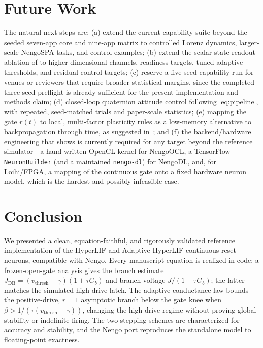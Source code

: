 \documentclass[11pt]{article}
\newcommand{\vth}{v_{\mathrm{thresh}}}
\newcommand{\Gb}{G_{b}}
\newcommand{\Jdb}{J_{\mathrm{DB}}}
\newcommand{\code}[1]{\texttt{#1}}
\begin{document}
\section{Future Work}\label{sec:future}
The natural next steps are: (a) extend the current capability suite beyond the
seeded seven-app core and nine-app matrix to controlled Lorenz dynamics,
larger-scale NengoSPA tasks, and control examples; (b) extend the scalar
state-readout ablation of  to higher-dimensional
channels, readiness targets, tuned adaptive thresholds, and residual-control
targets; (c) reserve a five-seed capability run for venues or reviewers that
require broader statistical margins, since the completed three-seed preflight is
already sufficient for the present implementation-and-methods claim; (d)
closed-loop quaternion attitude control following
\cref{eq:pipeline}, with repeated, seed-matched trials and paper-scale
statistics; (e) mapping the gate $r(t)$ to local, multi-factor plasticity rules
as a low-memory alternative to backpropagation through time, as suggested
in~\cite{hyperlif_theory}; and (f) the backend/hardware engineering that
 shows is currently required for any target beyond
the reference simulator---a hand-written OpenCL kernel for NengoOCL, a
TensorFlow \code{NeuronBuilder} (and a maintained \code{nengo-dl}) for NengoDL,
and, for Loihi/FPGA, a mapping of the continuous gate onto a fixed hardware
neuron model, which is the hardest and possibly infeasible case.

\section{Conclusion}\label{sec:conclusion}
We presented a clean, equation-faithful, and rigorously validated reference
implementation of the HyperLIF and Adaptive HyperLIF continuous-reset neurons,
compatible with Nengo. Every manuscript equation is realized in code; a
frozen-open-gate analysis gives the branch estimate
$\Jdb=(\vth-\gamma)(1+\tau\Gb)$ and branch voltage $J/(1+\tau\Gb)$; the latter
matches the simulated high-drive latch. The adaptive conductance law bounds the
positive-drive, $r=1$ asymptotic branch below the gate knee when
$\beta>1/(\tau(\vth-\gamma))$, changing the high-drive regime without proving
global stability or indefinite firing. The two stepping schemes
are characterized for accuracy and stability, and the Nengo port reproduces the
standalone model to floating-point exactness.
\end{document}

